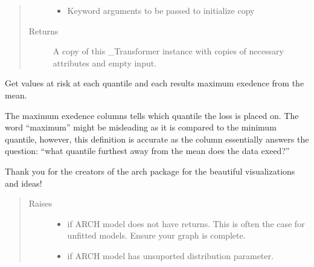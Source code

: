 \documentclass[letterpaper,10pt,english]{sphinxmanual}
\begin{document}
\begin{fulllineitems}
\begin{fulllineitems}
\begin{quote}
\begin{description}
\begin{itemize}
\item {} 
 \textendash{} Keyword arguments to be passed to initialize copy

\end{itemize}

\item[{Returns}] \leavevmode
A copy of this \_Transformer instance with copies of necessary
attributes and empty input.

\end{description}\end{quote}

\end{fulllineitems}


\begin{fulllineitems}
\label{\detokenize{dalio.pipe:dalio.pipe.builders.ValueAtRisk.transform}}
Get values at risk at each quantile and each results maximum
exedence from the mean.

The maximum exedence columns tells which quantile the loss is placed
on. The word “maximum” might be misleading as it is compared to the
minimum quantile, however, this definition is accurate as the column
essentially answers the question: “what quantile furthest away from
the mean does the data exeed?”

Thank you for the creators of the arch package for the beautiful
visualizations and ideas!
\begin{quote}\begin{description}
\item[{Raises}] \leavevmode\begin{itemize}
\item {} 
 \textendash{} if ARCH model does not have returns. This is often
    the case for unfitted models. Ensure your graph is complete.

\item {} 
 \textendash{} if ARCH model has unsuported distribution parameter.

\end{itemize}

\end{description}\end{quote}

\end{fulllineitems}


\end{fulllineitems}
\end{document}
